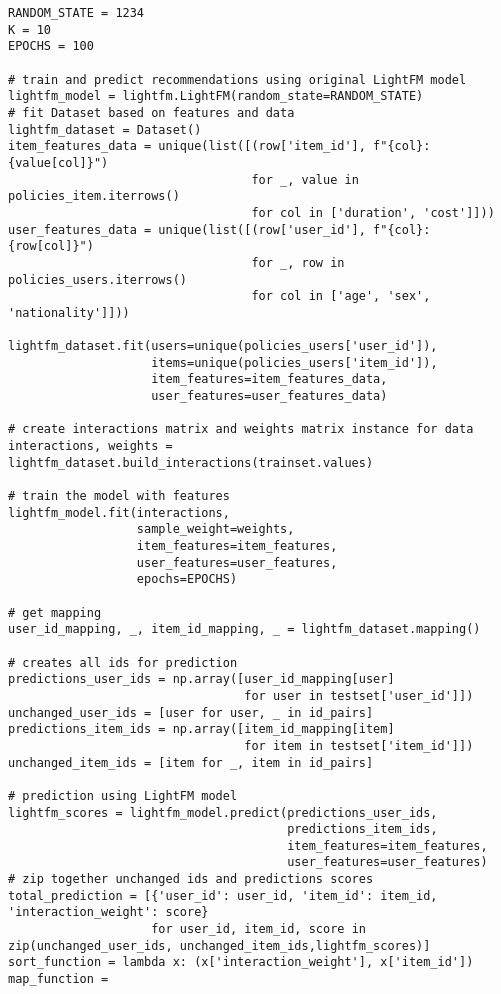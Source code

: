 \begin{lstlisting}[caption=esempio di utilizzo completo della libreria \textit{LightFM}]
RANDOM_STATE = 1234
K = 10
EPOCHS = 100

# train and predict recommendations using original LightFM model
lightfm_model = lightfm.LightFM(random_state=RANDOM_STATE)
# fit Dataset based on features and data
lightfm_dataset = Dataset()
item_features_data = unique(list([(row['item_id'], f"{col}:{value[col]}") 
                                  for _, value in policies_item.iterrows() 
                                  for col in ['duration', 'cost']]))
user_features_data = unique(list([(row['user_id'], f"{col}:{row[col]}")
                                  for _, row in policies_users.iterrows() 
                                  for col in ['age', 'sex', 'nationality']]))

lightfm_dataset.fit(users=unique(policies_users['user_id']),
                    items=unique(policies_users['item_id']),
                    item_features=item_features_data,
                    user_features=user_features_data)

# create interactions matrix and weights matrix instance for data
interactions, weights = lightfm_dataset.build_interactions(trainset.values)

# train the model with features
lightfm_model.fit(interactions,
                  sample_weight=weights,
                  item_features=item_features,
                  user_features=user_features,
                  epochs=EPOCHS)

# get mapping
user_id_mapping, _, item_id_mapping, _ = lightfm_dataset.mapping()

# creates all ids for prediction
predictions_user_ids = np.array([user_id_mapping[user] 
                                 for user in testset['user_id']])
unchanged_user_ids = [user for user, _ in id_pairs]
predictions_item_ids = np.array([item_id_mapping[item] 
                                 for item in testset['item_id']])
unchanged_item_ids = [item for _, item in id_pairs]

# prediction using LightFM model
lightfm_scores = lightfm_model.predict(predictions_user_ids,
                                       predictions_item_ids,
                                       item_features=item_features,
                                       user_features=user_features)
# zip together unchanged ids and predictions scores
total_prediction = [{'user_id': user_id, 'item_id': item_id, 'interaction_weight': score}
                    for user_id, item_id, score in zip(unchanged_user_ids, unchanged_item_ids,lightfm_scores)]
sort_function = lambda x: (x['interaction_weight'], x['item_id'])
map_function =



\end{lstlisting}
